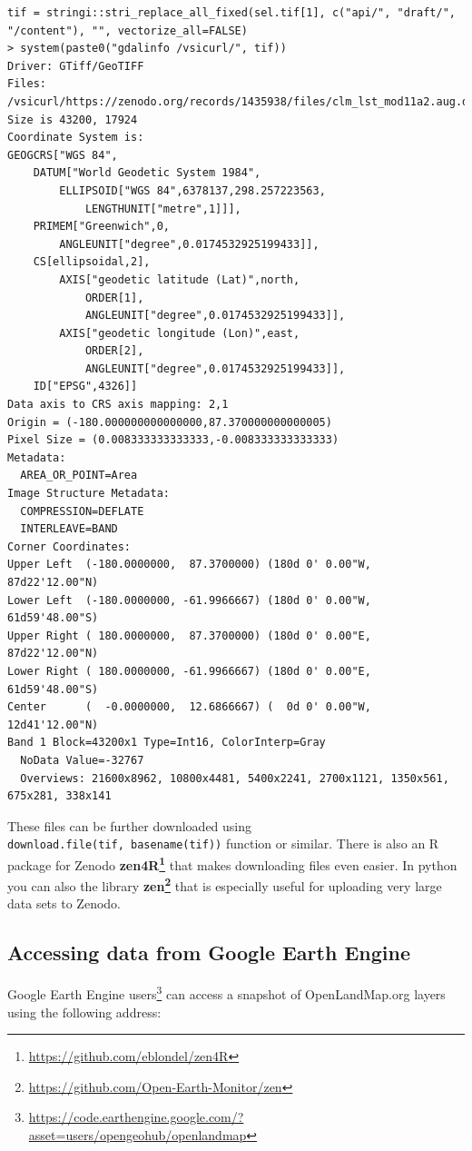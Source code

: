 \documentclass[
  graybox,natbib,nospthms]{svmono}
\renewcommand{\href}[2]{#2 (\url{#1})}
\renewcommand{\href}[2]{#2\footnote{\url{#1}}}
\begin{document}
\begin{verbatim}
tif = stringi::stri_replace_all_fixed(sel.tif[1], c("api/", "draft/", "/content"), "", vectorize_all=FALSE)
> system(paste0("gdalinfo /vsicurl/", tif))
Driver: GTiff/GeoTIFF
Files: /vsicurl/https://zenodo.org/records/1435938/files/clm_lst_mod11a2.aug.day_u.975_1km_s0..0cm_2000..2017_v1.0.tif
Size is 43200, 17924
Coordinate System is:
GEOGCRS["WGS 84",
    DATUM["World Geodetic System 1984",
        ELLIPSOID["WGS 84",6378137,298.257223563,
            LENGTHUNIT["metre",1]]],
    PRIMEM["Greenwich",0,
        ANGLEUNIT["degree",0.0174532925199433]],
    CS[ellipsoidal,2],
        AXIS["geodetic latitude (Lat)",north,
            ORDER[1],
            ANGLEUNIT["degree",0.0174532925199433]],
        AXIS["geodetic longitude (Lon)",east,
            ORDER[2],
            ANGLEUNIT["degree",0.0174532925199433]],
    ID["EPSG",4326]]
Data axis to CRS axis mapping: 2,1
Origin = (-180.000000000000000,87.370000000000005)
Pixel Size = (0.008333333333333,-0.008333333333333)
Metadata:
  AREA_OR_POINT=Area
Image Structure Metadata:
  COMPRESSION=DEFLATE
  INTERLEAVE=BAND
Corner Coordinates:
Upper Left  (-180.0000000,  87.3700000) (180d 0' 0.00"W, 87d22'12.00"N)
Lower Left  (-180.0000000, -61.9966667) (180d 0' 0.00"W, 61d59'48.00"S)
Upper Right ( 180.0000000,  87.3700000) (180d 0' 0.00"E, 87d22'12.00"N)
Lower Right ( 180.0000000, -61.9966667) (180d 0' 0.00"E, 61d59'48.00"S)
Center      (  -0.0000000,  12.6866667) (  0d 0' 0.00"W, 12d41'12.00"N)
Band 1 Block=43200x1 Type=Int16, ColorInterp=Gray
  NoData Value=-32767
  Overviews: 21600x8962, 10800x4481, 5400x2241, 2700x1121, 1350x561, 675x281, 338x141
\end{verbatim}

These files can be further downloaded using \texttt{download.file(tif,\ basename(tif))} function or similar.
There is also an R package for Zenodo \textbf{\href{https://github.com/eblondel/zen4R}{zen4R}}
that makes downloading files even easier. In python you can also the library
\textbf{\href{https://github.com/Open-Earth-Monitor/zen}{zen}} that is especially useful
for uploading very large data sets to Zenodo.

\hypertarget{accessing-data-from-google-earth-engine}{%
\subsection{Accessing data from Google Earth Engine}\label{accessing-data-from-google-earth-engine}}

\href{https://code.earthengine.google.com/?asset=users/opengeohub/openlandmap}{Google Earth Engine users} can access a snapshot of OpenLandMap.org layers using the following address:
\end{document}
